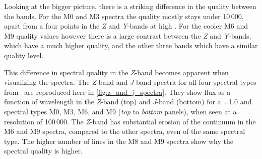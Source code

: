 Looking at the bigger picture, there is a striking difference in the quality between the bands.
For the {M0} and {M3} spectra the quality mostly stays under 10\,000, apart from a four points in the \emph{Z} and \emph{Y}-bands at high \feh{}.
For the cooler {M6} and {M9} quality values however there is a large contrast between the \emph{Z} and \emph{Y}-bands, which have a much higher quality, and the other three bands which have a similar quality level.

This difference in spectral quality in the \emph{Z}-band becomes apparent when visualizing the spectra.
The \emph{Z}-band and \emph{J}-band spectra for all four spectral types from~\citet{figueira_radial_2016} are reproduced here in \cref{fig:z_and_j_spectra}.
They show flux as a function of wavelength in the \emph{Z}-band (top) and \emph{J}-band (bottom) for a \Vsini{}=1.0\kmps{} and spectral types {M0}, {M3}, {M6}, and {M9} (\textit{top} to \textit{bottom} panels), when seen at a resolution of 100\,000.
The \emph{Z}-band has substantial erosion of the continuum in the {M6} and {M9} spectra, compared to the other spectra, even of the same spectral type.
The higher number of lines in the M8 and {M9} spectra show why the spectral quality is higher.

